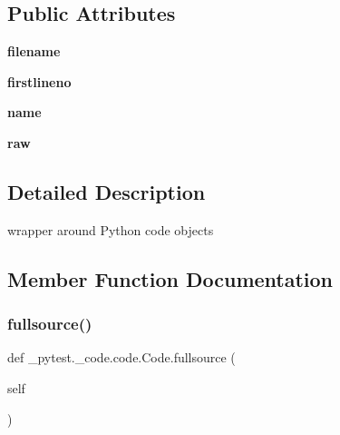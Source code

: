 \subsection*{Public Attributes}
\begin{DoxyCompactItemize}
\item 
\mbox{\label{class__pytest_1_1__code_1_1code_1_1_code_ad155c86f7f8f466fae728b1e493f70f2}} 
{\bfseries filename}
\item 
\mbox{\label{class__pytest_1_1__code_1_1code_1_1_code_a453efdca142ae4f960e223868978cf2a}} 
{\bfseries firstlineno}
\item 
\mbox{\label{class__pytest_1_1__code_1_1code_1_1_code_a07f777a5149cb777a1df98b65682d3b7}} 
{\bfseries name}
\item 
\mbox{\label{class__pytest_1_1__code_1_1code_1_1_code_aa1d1e148283a5f5efc6a61d96a8b686b}} 
{\bfseries raw}
\end{DoxyCompactItemize}


\subsection{Detailed Description}
\begin{DoxyVerb}wrapper around Python code objects \end{DoxyVerb}
 

\subsection{Member Function Documentation}
\mbox{\label{class__pytest_1_1__code_1_1code_1_1_code_a9e8e8b252337ba9d050e0fe2546d2d0c}} 
\subsubsection{\texorpdfstring{fullsource()}{fullsource()}}
{\footnotesize\ttfamily def \+\_\+pytest.\+\_\+code.\+code.\+Code.\+fullsource (\begin{DoxyParamCaption}\item[{}]{self }\end{DoxyParamCaption})}

